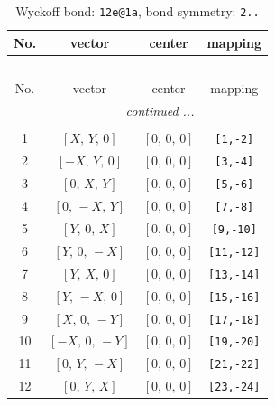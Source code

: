 \documentclass[fleqn,8pt]{jsarticle}
\begin{document}
\begin{longtable}{cccc}
\caption{Wyckoff bond: {\tt 12e@1a}, bond symmetry: {\tt 2..}}
 \\
 \hline \hline
No. & vector & center & mapping \\ \hline \endfirsthead

\multicolumn{3}{l}{\tablename\ \thetable{}} \\
 \hline \hline
No. & vector & center & mapping \\ \hline \endhead

 \hline \hline
\multicolumn{3}{r}{\footnotesize\it continued ...} \\ \endfoot

 \hline \hline
\multicolumn{3}{r}{} \\ \endlastfoot

1 & $\left[ X,\, Y,\, 0 \right]$ & $\left[ 0,\, 0,\, 0 \right]$ & {\tt [1,-2]} \\ \hline
2 & $\left[ - X,\, Y,\, 0 \right]$ & $\left[ 0,\, 0,\, 0 \right]$ & {\tt [3,-4]} \\ \hline
3 & $\left[ 0,\, X,\, Y \right]$ & $\left[ 0,\, 0,\, 0 \right]$ & {\tt [5,-6]} \\ \hline
4 & $\left[ 0,\, - X,\, Y \right]$ & $\left[ 0,\, 0,\, 0 \right]$ & {\tt [7,-8]} \\ \hline
5 & $\left[ Y,\, 0,\, X \right]$ & $\left[ 0,\, 0,\, 0 \right]$ & {\tt [9,-10]} \\ \hline
6 & $\left[ Y,\, 0,\, - X \right]$ & $\left[ 0,\, 0,\, 0 \right]$ & {\tt [11,-12]} \\ \hline
7 & $\left[ Y,\, X,\, 0 \right]$ & $\left[ 0,\, 0,\, 0 \right]$ & {\tt [13,-14]} \\ \hline
8 & $\left[ Y,\, - X,\, 0 \right]$ & $\left[ 0,\, 0,\, 0 \right]$ & {\tt [15,-16]} \\ \hline
9 & $\left[ X,\, 0,\, - Y \right]$ & $\left[ 0,\, 0,\, 0 \right]$ & {\tt [17,-18]} \\ \hline
10 & $\left[ - X,\, 0,\, - Y \right]$ & $\left[ 0,\, 0,\, 0 \right]$ & {\tt [19,-20]} \\ \hline
11 & $\left[ 0,\, Y,\, - X \right]$ & $\left[ 0,\, 0,\, 0 \right]$ & {\tt [21,-22]} \\ \hline
12 & $\left[ 0,\, Y,\, X \right]$ & $\left[ 0,\, 0,\, 0 \right]$ & {\tt [23,-24]} \\
\end{longtable}
\renewcommand{\arraystretch}{1.2}
\end{document}
